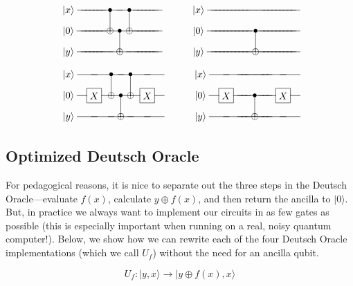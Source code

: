 \documentclass[12pt, letterpaper]{article}
\makeatletter
\def\w{\ar@{-}[l]}
\def\A#1{\save []="#1" \restore}
\def\op#1{*+[F]{\rule[-0.2ex]{0ex}{2.1ex}#1}}	%
\def\b{*={\bullet}}
\def\o{*={\oplus}}
\def\n{*-{}\w}
\def\>{\rangle}
\def\q#1{*+{\rule[-0.2ex]{0ex}{2.1ex}|#1\>}}
\makeatother
\begin{document}
\def\gAxB{\op{X}\w\A{gAxB}}
\def\gBxA{\b\w\A{gBxA}}
\def\gBxB{\o\w\A{gBxB}}
\def\gCxB{\b\w\A{gCxB}}
\def\gCxC{\o\w\A{gCxC}}
\def\gDxA{\b\w\A{gDxA}}
\def\gDxB{\o\w\A{gDxB}}
\def\gExB{\op{X}\w\A{gExB}}
\def\bA{ \q{x}}
\def\bB{ \q{0}}
\def\bC{ \q{y}}
$$\xymatrix@R=5pt@C=10pt{
    \bA &\n &\n &\n &\n &\n &\n &\gBxA &\n &\gDxA &\n &\n &\n &\n &\n &\n &\n
\\  \bB &\n &\n &\n &\n &\n &\n &\gBxB &\gCxB &\gDxB &\n &\n &\n &\n &\n &\n &\n
\\  \bC &\n &\n &\n &\n &\n &\n &\n &\gCxC &\n &\n &\n &\n &\n &\n &\n &\n
\ar@{-}"gBxB";"gBxA"
\ar@{-}"gCxC";"gCxB"
\ar@{-}"gDxB";"gDxA"
}\hspace{1 cm}
\xymatrix@R=5pt@C=10pt{
    \bA &\n &\n &\n &\n &\n &\n &\n &\n &\n &\n &\n &\n &\n &\n &\n &\n &\n & \n &\n &\n &\n
\\  \bB &\n &\n &\n &\n &\n &\n &\n &\n &\n &\n &\gCxB &\n &\n &\n &\n &\n &\n &\n &\n &\n &\n
\\  \bC &\n &\n &\n &\n &\n &\n &\n &\n &\n &\n &\gCxC &\n &\n &\n &\n &\n &\n & \n &\n &\n &\n
\ar@{-}"gCxC";"gCxB"
}$$
$$\xymatrix@R=5pt@C=10pt{
    \bA &\n &\gBxA &\n &\gDxA &\n &\n
\\  \bB &\gAxB &\gBxB &\gCxB &\gDxB &\gExB &\n
\\  \bC &\n &\n &\gCxC &\n &\n &\n
\ar@{-}"gBxB";"gBxA"
\ar@{-}"gCxC";"gCxB"
\ar@{-}"gDxB";"gDxA"
}\hspace{1 cm}
\xymatrix@R=5pt@C=10pt{
    \bA &\n &\n &\n &\n &\n &\n &\n &\n &\n &\n
\\  \bB &\gAxB &\n &\n &\n &\gCxB &\n &\n &\n &\gAxB &\n
\\  \bC &\n &\n &\n &\n &\gCxC &\n &\n &\n &\n &\n
\ar@{-}"gCxC";"gCxB"
}$$

\subsection{Optimized Deutsch Oracle}

For pedagogical reasons, it is nice to separate out the three steps in the Deutsch Oracle—evaluate $f(x)$, calculate $y \oplus f(x)$, and then return the ancilla to $|0\rangle$. But, in practice we always want to implement our circuits in as few gates as possible (this is especially important when running on a real, noisy quantum computer!). Below, we show how we can rewrite each of the four Deutsch Oracle implementations (which we call $U_f$) without the need for an ancilla qubit.

\vspace{20 mm}
\begin{equation}
U_f : |y, x\rangle \rightarrow |y \oplus f(x), x\rangle
\end{equation}
\end{document}

